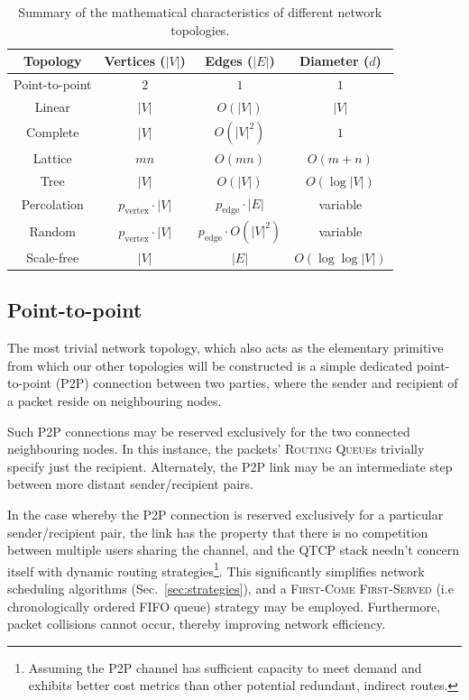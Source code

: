\startnormtable
\begin{table}[!htbp]
	\begin{tabular}{|c|c|c|c|}
		\hline
  		Topology & Vertices ($|V|$) & Edges ($|E|$) & Diameter ($d$) \\
      	\hline
      	\hline
      	Point-to-point & $2$ & $1$ & $1$ \\
      	Linear & $|V|$ & \mbox{$O(|V|)$} & \mbox{$|V|$} \\
      	Complete & $|V|$ & \mbox{$O(|V|^2)$} & $1$ \\
      	Lattice & $mn$ & \mbox{$O(mn)$} & \mbox{$O(m+n)$} \\
      	Tree & $|V|$ & \mbox{$O(|V|)$} & \mbox{$O(\log |V|)$} \\
      	Percolation & \mbox{$p_\mathrm{vertex}\cdot |V|$} & \mbox{$p_\mathrm{edge}\cdot |E|$} & variable \\
      	Random & \mbox{$p_\mathrm{vertex}\cdot |V|$} & \mbox{$p_\mathrm{edge}\cdot O(|V|^2)$} & variable \\
      	Scale-free & $|V|$ & $|E|$ & \mbox{$O(\log\log |V|)$}\\
      	\hline
	\end{tabular}
	\captionspacetab \caption{Summary of the mathematical characteristics of different network topologies.} \label{tab:net_top_sum}
\end{table}
\startalgtable

%
%

\subsection{Point-to-point} \label{sec:P2P_topol}

The most trivial network topology, which also acts as the elementary primitive from which our other topologies will be constructed is a simple dedicated point-to-point (P2P) connection between two parties, where the sender and recipient of a packet reside on neighbouring nodes.

Such P2P connections may be reserved exclusively for the two connected neighbouring nodes. In this instance, the packets' \textsc{Routing Queue}s trivially specify just the recipient. Alternately, the P2P link may be an intermediate step between more distant sender/recipient pairs.

In the case whereby the P2P connection is reserved exclusively for a particular sender/recipient pair, the link has the property that there is no competition between multiple users sharing the channel, and the QTCP stack needn't concern itself with dynamic routing strategies\footnote{Assuming the P2P channel has sufficient capacity to meet demand and exhibits better cost metrics than other potential redundant, indirect routes.}. This significantly simplifies network scheduling algorithms (Sec.~\ref{sec:strategies}), and a \textsc{First-Come First-Served} (i.e chronologically ordered FIFO queue) strategy may be employed. Furthermore, packet collisions cannot occur, thereby improving network efficiency.

